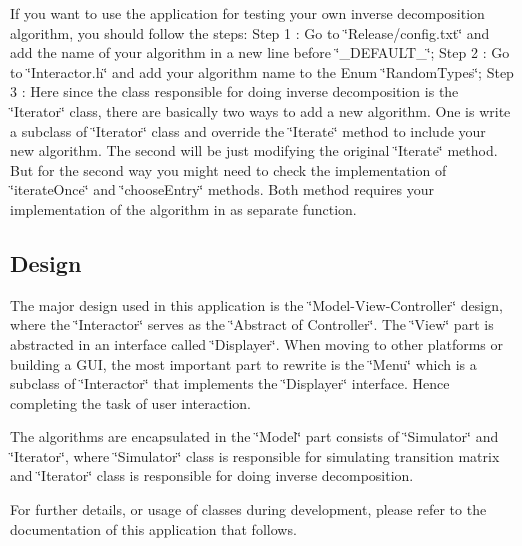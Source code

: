 If you want to use the application for testing your own inverse decomposition algorithm, you should follow the steps\+: Step 1 \+: Go to \char`\"{}\+Release/config.\+txt\char`\"{} and add the name of your algorithm in a new line before \char`\"{}\+\_\+\+D\+E\+F\+A\+U\+L\+T\+\_\+\char`\"{}; Step 2 \+: Go to \char`\"{}\+Interactor.\+h\char`\"{} and add your algorithm name to the Enum \char`\"{}\+Random\+Types\char`\"{}; Step 3 \+: Here since the class responsible for doing inverse decomposition is the \char`\"{}\+Iterator\char`\"{} class, there are basically two ways to add a new algorithm. One is write a subclass of \char`\"{}\+Iterator\char`\"{} class and override the \char`\"{}\+Iterate\char`\"{} method to include your new algorithm. The second will be just modifying the original \char`\"{}\+Iterate\char`\"{} method. But for the second way you might need to check the implementation of \char`\"{}iterate\+Once\char`\"{} and \char`\"{}choose\+Entry\char`\"{} methods. Both method requires your implementation of the algorithm in as separate function.\hypertarget{index_Design}{}\subsection{Design}\label{index_Design}
The major design used in this application is the \char`\"{}\+Model-\/\+View-\/\+Controller\char`\"{} design, where the \char`\"{}\+Interactor\char`\"{} serves as the \char`\"{}\+Abstract of Controller\char`\"{}. The \char`\"{}\+View\char`\"{} part is abstracted in an interface called \char`\"{}\+Displayer\char`\"{}. When moving to other platforms or building a G\+U\+I, the most important part to rewrite is the \char`\"{}\+Menu\char`\"{} which is a subclass of \char`\"{}\+Interactor\char`\"{} that implements the \char`\"{}\+Displayer\char`\"{} interface. Hence completing the task of user interaction.

The algorithms are encapsulated in the \char`\"{}\+Model\char`\"{} part consists of \char`\"{}\+Simulator\char`\"{} and \char`\"{}\+Iterator\char`\"{}, where \char`\"{}\+Simulator\char`\"{} class is responsible for simulating transition matrix and \char`\"{}\+Iterator\char`\"{} class is responsible for doing inverse decomposition.

For further details, or usage of classes during development, please refer to the documentation of this application that follows. 